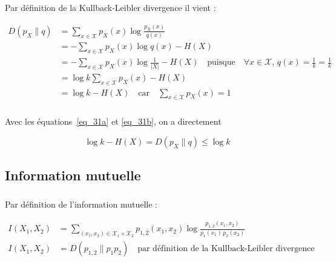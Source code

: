 \documentclass[12pt,a4paper,onecolumn]{article}
\begin{document}
\subsubsection{}

Par définition de la Kullback-Leibler divergence il vient :

\begin{equation}
	\begin{split}
		D(p_X \parallel q) &= \sum_{x \in \mathcal{X}}p_X(x)\log\frac{p_X(x)}{q(x)}\\
		&= -\sum_{x \in \mathcal{X}}p_X(x)\log q(x) - H(X) \\
		&= -\sum_{x \in \mathcal{X}}p_X(x)\log\frac{1}{|X|} - H(X) \quad \text{puisque} \quad \forall x \in \mathcal{X},\, q(x) = \frac{1}{k} = \frac{1}{k}\\
		&= \log k\sum_{x \in \mathcal{X}}p_X(x) - H(X)\\
		&= \log k - H(X) \quad \text{car} \quad \sum_{x \in \mathcal{X}}p_X(x) = 1
	\end{split}
	\label{eq_31b}
\end{equation}

\subsubsection{}
Avec les équations~\eqref{eq_31a} et \eqref{eq_31b}, on a directement

\begin{equation}
	\log k - H(X) = D(p_X \parallel q) \leq \log k
\end{equation}

\subsection{Information mutuelle}

\subsubsection{}
Par définition de l'information mutuelle :

\begin{equation}
	\begin{split}
		I(X_1, X_2) &= \sum_{(x_1,x_2)\in\mathcal{X}_1\times\mathcal{X}_2} p_{1, 2}(x_1,x_2) \log \frac{p_{1, 2}(x_1,x_2)}{p_1(x_1)\,p_2(x_2)}\\
		I(X_1, X_2) &= D(p_{1, 2} \parallel p_1p_2) \quad \text{par définition de la Kullback-Leibler divergence}
	\end{split}
\end{equation}
\end{document}
